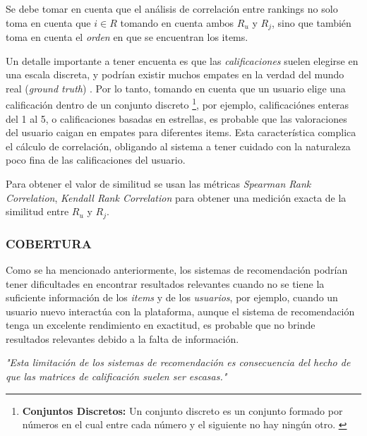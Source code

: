 \begin{itemize}
\begin{itemize}[label=$\diamond$]
            Se debe tomar en cuenta que el análisis de correlación entre rankings no solo toma en cuenta que $i \in R$ tomando en cuenta ambos $R_u$ y $R_j$, sino que también toma en cuenta el \textit{orden} en que se encuentran los items.
            
            Un detalle importante a tener encuenta es que las \textit{calificaciones} suelen elegirse en una escala discreta, y podrían existir muchos empates en la verdad del mundo real (\textit{ground truth}) \parencite{Aggarwal2016}.
            Por lo tanto, tomando en cuenta que un usuario elige una calificación dentro de un conjunto discreto \footnote{\textbf{Conjuntos Discretos: } Un conjunto discreto es un conjunto formado por números en el cual entre cada número y el siguiente no hay ningún otro. \parencite{Perez_MAT_2021}}, por ejemplo, calificaciónes enteras del 1 al 5, o calificaciones basadas en estrellas, es probable que las valoraciones del usuario caigan en empates para diferentes items.
            Esta característica complica el cálculo de correlación, obligando al sistema a tener cuidado con la naturaleza poco fina de las calificaciones del usuario.
            
            Para obtener el valor de similitud se usan las  métricas \textit{Spearman Rank Correlation}, \textit{Kendall Rank Correlation} para obtener una medición exacta de la similitud entre $R_u$ y $R_j$. 
        \end{itemize}         
    \end{itemize}



            \newpage
            \thispagestyle{plain}
            \vspace*{0.2cm}
            
    \subsubsection{COBERTURA}

    Como se ha mencionado anteriormente, los sistemas de recomendación podrían tener dificultades en encontrar resultados relevantes cuando no se tiene la suficiente información de los \textit{items} y de los \textit{usuarios}, por ejemplo, cuando un usuario nuevo interactúa con la plataforma, aunque el sistema de recomendación tenga un excelente rendimiento en exactitud, es probable que no brinde resultados relevantes debido a la falta de información. 

    \textit{"Esta limitación de los sistemas de recomendación es consecuencia del hecho de que las matrices de calificación suelen ser escasas."} \parencite{Aggarwal2016}

